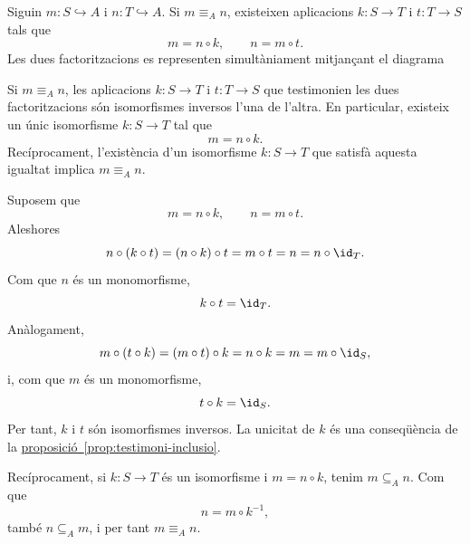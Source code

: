 Siguin \(m:S\hookrightarrow A\) i \(n:T\hookrightarrow A\). Si \(m\equiv_A n\), existeixen aplicacions \(k:S\to T\) i \(t:T\to S\) tals que
\[
m=n\circ k,
\qquad
n=m\circ t.
\]
Les dues factoritzacions es representen simultàniament mitjançant el diagrama
\begin{center}
\end{center}

\begin{proposicio}\label{prop:parts-equivalents-isomorfisme}
Si \(m\equiv_A n\), les aplicacions \(k:S\to T\) i \(t:T\to S\) que testimonien les dues factoritzacions són isomorfismes inversos l'una de l'altra. En particular, existeix un únic isomorfisme \(k:S\to T\) tal que
\[
m=n\circ k.
\]
Recíprocament, l'existència d'un isomorfisme \(k:S\to T\) que satisfà aquesta igualtat implica \(m\equiv_A n\).
\end{proposicio}

\begin{prova}
Suposem que
\[
m=n\circ k,
\qquad
n=m\circ t.
\]
Aleshores
\[
n\circ(k\circ t)
=(n\circ k)\circ t
=m\circ t
=n
=n\circ\id_T.
\]
Com que \(n\) és un monomorfisme,
\[
k\circ t=\id_T.
\]
Anàlogament,
\[
m\circ(t\circ k)
=(m\circ t)\circ k
=n\circ k
=m
=m\circ\id_S,
\]
i, com que \(m\) és un monomorfisme,
\[
t\circ k=\id_S.
\]
Per tant, \(k\) i \(t\) són isomorfismes inversos. La unicitat de \(k\) és una conseqüència de la \hyperref[prop:testimoni-inclusio]{proposició~\ref*{prop:testimoni-inclusio}}.

Recíprocament, si \(k:S\to T\) és un isomorfisme i \(m=n\circ k\), tenim \(m\subseteq_A n\). Com que
\[
n=m\circ k^{-1},
\]
també \(n\subseteq_A m\), i per tant \(m\equiv_A n\).
\end{prova}

